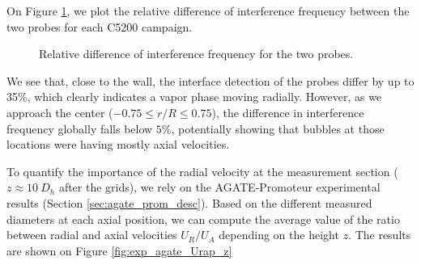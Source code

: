 On Figure \ref{fig:exp_C52_deltanu}, we plot the relative difference of interference frequency between the two probes for each C5200 campaign. 


\begin{figure}[!h]
\centering
{}

\caption{Relative difference of interference frequency for the two probes.}
\label{fig:exp_C52_deltanu}
\end{figure}


\npar


We see that, close to the wall, the interface detection of the probes differ by up to 35\%, which clearly indicates a vapor phase moving radially. However, as we approach the center ($-0.75 \leq r/R \leq 0.75$), the difference in interference frequency globally falls below $5\%$, potentially showing that bubbles at those locations were having mostly axial velocities.

\npar

To quantify the importance of the radial velocity at the measurement section ($z\approx 10\ D_{h}$ after the grids), we rely on the AGATE-Promoteur experimental results (Section \ref{sec:agate_prom_desc}). Based on the different measured diameters at each axial position, we can compute the average value of the ratio between radial and axial velocities $U_{R} / U_{A}$ depending on the height $z$. The results are shown on Figure \ref{fig:exp_agate_Urap_z}


